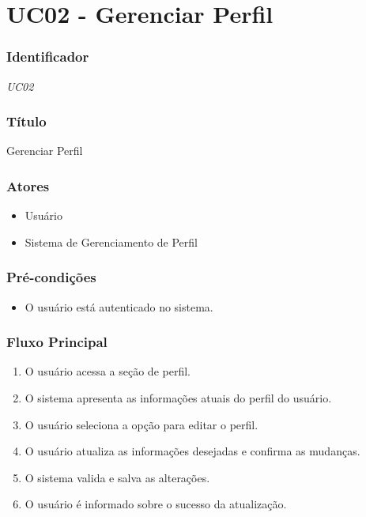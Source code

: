 \chapter{UC02 - Gerenciar Perfil}
\label{apendiceUC02}

\subsection*{Identificador}
\textit{UC02}

\subsection*{Título}
Gerenciar Perfil

\subsection*{Atores}
\begin{addmargin}[1.5cm]{0cm}
	\begin{itemize}
		\item Usuário
		\item Sistema de Gerenciamento de Perfil
	\end{itemize}
\end{addmargin}

\subsection*{Pré-condições}
\begin{addmargin}[1.5cm]{0cm}
	\begin{itemize}
		\item O usuário está autenticado no sistema.
	\end{itemize}
\end{addmargin}

\subsection*{Fluxo Principal}
\begin{addmargin}[1.5cm]{0cm}
	\begin{enumerate}
		\item O usuário acessa a seção de perfil.
		\item O sistema apresenta as informações atuais do perfil do usuário.
		\item O usuário seleciona a opção para editar o perfil.
		\item O usuário atualiza as informações desejadas e confirma as mudanças.
		\item O sistema valida e salva as alterações.
		\item O usuário é informado sobre o sucesso da atualização.
	\end{enumerate}
\end{addmargin}

